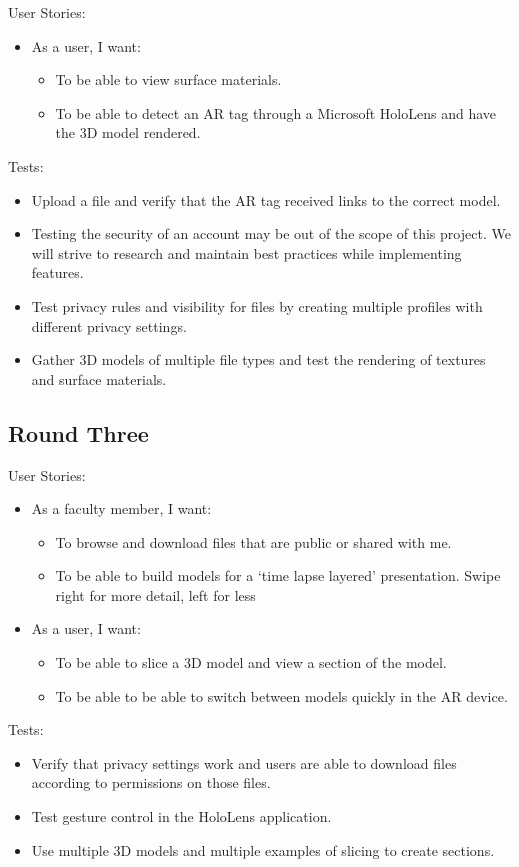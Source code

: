 User Stories:
\begin{itemize}
	\item As a user, I want:
	\begin{itemize}
		\item To be able to view surface materials.
		\item To be able to detect an AR tag through a Microsoft HoloLens and  have the 3D model rendered.
	\end{itemize}
\end{itemize}
Tests:
\begin{itemize}
	\item Upload a file and verify that the AR tag received links to the correct
	model.
	\item Testing the security of an account may be out of the scope of this 
	project. We will strive to research and maintain best practices while 
	implementing features.
	\item Test privacy rules and visibility for files by creating multiple 
	profiles with different privacy settings.
	\item Gather 3D models of multiple file types and test the rendering of 
	textures and surface materials.
\end{itemize}

\subsection{Round Three}

User Stories:
\begin{itemize}
	\item As a faculty member, I want:
	\begin{itemize}
		\item To browse and download files that are public or shared with me.
		\item To be able to build models for a ‘time lapse layered’ 
		presentation. Swipe right for more detail, left for less
	\end{itemize}
	\item As a user, I want: 
	\begin{itemize}
		\item To be able to slice a 3D model and view a section of the model.
		\item To be able to be able to switch between models quickly in the AR 
		device.
	\end{itemize}
\end{itemize}
Tests:
\begin{itemize}
	\item Verify that privacy settings work and users are able to download files
	according to permissions on those files.
	\item Test gesture control in the HoloLens application.
	\item Use multiple 3D models and multiple examples of slicing to create 
	sections.
\end{itemize}